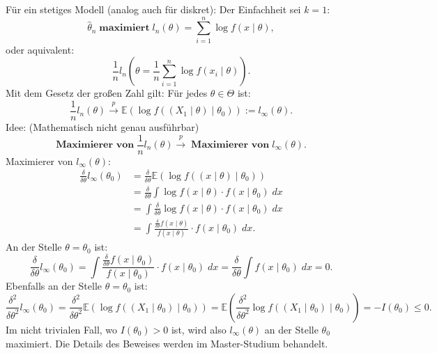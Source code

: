 \documentclass[10pt]{article}
\newcommand{\EW}{\mathbb{E}} %
\newcommand{\KW}{\overset{p} \longrightarrow} %
\newcommand{\xt}{x \mid \theta} %
\newenvironment{BWS}[1][]
{\begin{Beweis}[frametitle=#1]}{\end{Beweis}}
\begin{document}
	\begin{BWS}[Beweisidee]
		Für ein stetiges Modell (analog auch für diskret):
		Der Einfachheit sei $k=1$:
		\begin{equation*}
			\hat{\theta}_n \; \textbf{maximiert} \; l_n(\theta) = \sum_{i=1}^{n}\log f(\xt), 
		\end{equation*}
		oder aquivalent:
		\begin{equation*}
			\frac{1}{n} l_n(\theta = \frac{1}{n}\sum_{i=1}^{n}\log f(x_i \mid \theta)).
		\end{equation*}
		Mit dem Gesetz der großen Zahl gilt:
		Für jedes $\theta \in \Theta$ ist:
		\begin{equation*}
			\frac{1}{n} l_n (\theta) \KW \EW(\log f((X_1 \mid \theta) \mid \theta_0)) := l_\infty (\theta).
		\end{equation*}
		Idee: (Mathematisch nicht genau ausführbar)
		\begin{equation*}
			\textbf{Maximierer von} \; \frac{1}{n} l_n(\theta) \KW \; \textbf{Maximierer von} \; l_\infty (\theta).
		\end{equation*}
		Maximierer von $l_\infty (\theta)$:
		\begin{equation*}
			\begin{split}
				\frac{\delta}{\delta \theta} l_\infty (\theta_0) &= \frac{\delta}{\delta \theta} \EW(\log f((x\mid \theta)\mid \theta_0))\\
				&= \frac{\delta}{\delta \theta} \int \log f(x \mid \theta) \cdot f(x \mid \theta_0) \; dx \\
				&= \int \frac{\delta}{\delta \theta} \log f(x \mid \theta) \cdot f(x\mid \theta_0) \; dx \\
				&=\int \frac{\frac{\delta}{\delta \theta} f(x\mid \theta)}{f(x\mid \theta)} \cdot f(x\mid \theta_0) \; dx. 
			\end{split}
		\end{equation*}
		An der Stelle $\theta = \theta_0$ ist:
		\begin{equation*}
			\frac{\delta}{\delta \theta} l_\infty (\theta_0) = \int \frac{\frac{\delta}{\delta \theta} f(x\mid\theta_0)}{f(x\mid\theta_0)} \cdot f(x\mid\theta_0) \; dx = \frac{\delta}{\delta \theta} \int f(x\mid\theta_0) \; dx = 0.
		\end{equation*}
		Ebenfalls an der Stelle $\theta = \theta_0$ ist:
		\begin{equation*}
			\frac{\delta^2}{\delta \theta^2} l_\infty(\theta_0) = \frac{\delta^2}{\delta \theta^2} \EW (\log f((X_1 \mid \theta_0) \mid \theta_0)) = \EW \left(\frac{\delta^2}{\delta \theta^2}\log f\left(\left(X_1 \mid \theta_0\right) \mid \theta_0\right)\right) = - I(\theta_0) \leq 0.
		\end{equation*}
		Im nicht trivialen Fall, wo $I(\theta_0) > 0$ ist, wird also $l_\infty (\theta)$ an der Stelle $\theta_0$ maximiert. Die Details des Beweises werden im Master-Studium behandelt. 
	\end{BWS}
	
\end{document}
